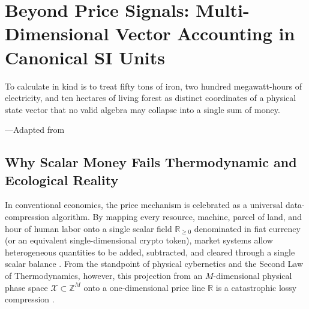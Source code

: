 \chapter{Beyond Price Signals: Multi-Dimensional Vector Accounting in Canonical SI Units}
\label{ch:vector-accounting-si}

\epigraph{To calculate in kind is to treat fifty tons of iron, two hundred megawatt-hours of electricity, and ten hectares of living forest as distinct coordinates of a physical state vector that no valid algebra may collapse into a single sum of money.}{---Adapted from \textcite{neurath1919}}

\section{Why Scalar Money Fails Thermodynamic and Ecological Reality}
\label{sec:ch1-scalar-failure}

In conventional economics, the price mechanism is celebrated as a universal data-compression algorithm. By mapping every resource, machine, parcel of land, and hour of human labor onto a single scalar field $\mathbb{R}_{\ge 0}$ denominated in fiat currency (or an equivalent single-dimensional crypto token), market systems allow heterogeneous quantities to be added, subtracted, and cleared through a single scalar balance \parencite{polanyi1944}. From the standpoint of physical cybernetics and the Second Law of Thermodynamics, however, this projection from an $M$-dimensional physical phase space $\mathcal{X} \subset \mathbb{Z}^M$ onto a one-dimensional price line $\mathbb{R}$ is a catastrophic lossy compression \parencite{georgescu1971,ashby1956}.

